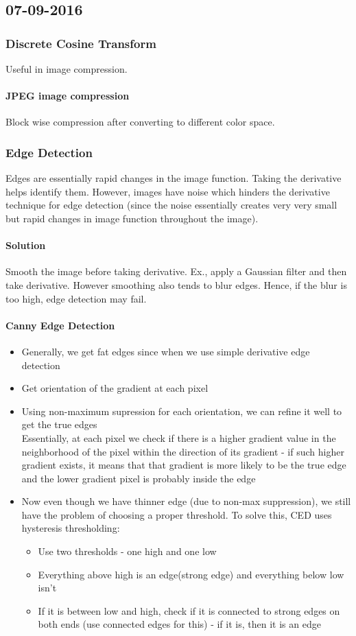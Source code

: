 \subsection{07-09-2016}
\subsubsection{Discrete Cosine Transform}
Useful in image compression.
\paragraph{JPEG image compression}
Block wise compression after converting to different color space.

\subsubsection{Edge Detection}
Edges are essentially rapid changes in the image function. Taking the derivative helps identify them. However, images have noise which hinders the derivative technique for edge detection (since the noise essentially creates very very small but rapid changes in image function throughout the image).
\paragraph{Solution}
Smooth the image before taking derivative. Ex., apply a Gaussian filter and then take derivative.
However smoothing also tends to blur edges. Hence, if the blur is too high, edge detection may fail.
\paragraph{Canny Edge Detection}
\begin{itemize}
	\item Generally, we get fat edges since when we use simple derivative edge detection
	\item Get orientation of the gradient at each pixel
	\item Using non-maximum supression for each orientation, we can refine it well to get the true edges\\
	Essentially, at each pixel we check if there is a higher gradient value in the neighborhood of the pixel within the direction of its gradient - if such higher gradient exists, it means that that gradient is more likely to be the true edge and the lower gradient pixel is probably inside the edge
	\item Now even though we have thinner edge (due to non-max suppression), we still have the problem of choosing a proper threshold. To solve this, CED uses hysteresis thresholding:
	\begin{itemize}
		\item Use two thresholds - one high and one low
		\item Everything above high is an edge(strong edge) and everything below low isn't
		\item If it is between low and high, check if it is connected to strong edges on both ends (use connected edges for this) - if it is, then it is an edge
	\end{itemize}
\end{itemize}